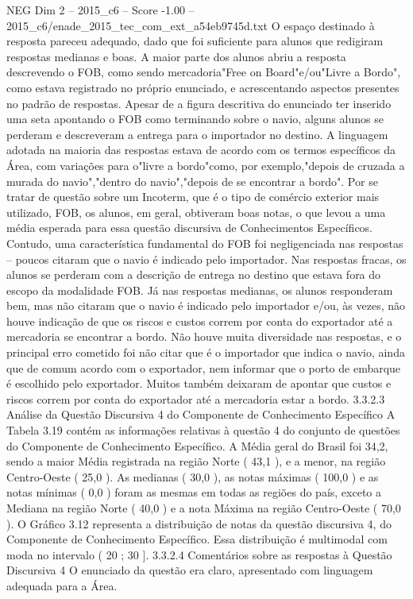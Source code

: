 \begin{textsample}{NEG Dim 2 – 2015\_c6 – Score -1.00 – 2015\_c6/enade\_2015\_tec\_com\_ext\_a54eb9745d.txt}
O espaço destinado à resposta pareceu adequado, dado que foi suficiente para alunos que redigiram respostas medianas e boas.
A maior parte dos alunos abriu a resposta descrevendo o FOB, como sendo mercadoria"Free on Board"e/ou"Livre a Bordo", como estava registrado no próprio enunciado, e acrescentando aspectos presentes no padrão de respostas.
Apesar de a figura descritiva do enunciado ter inserido uma seta apontando o FOB como terminando sobre o navio, alguns alunos se perderam e descreveram a entrega para o importador no destino.
A linguagem adotada na maioria das respostas estava de acordo com os termos específicos da Área, com variações para o"livre a bordo"como, por exemplo,"depois de cruzada a murada do navio","dentro do navio","depois de se encontrar a bordo".
Por se tratar de questão sobre um Incoterm, que é o tipo de comércio exterior mais utilizado, FOB, os alunos, em geral, obtiveram boas notas, o que levou a uma média esperada para essa questão discursiva de Conhecimentos Específicos.
Contudo, uma característica fundamental do FOB foi negligenciada nas respostas – poucos citaram que o navio é indicado pelo importador.
Nas respostas fracas, os alunos se perderam com a descrição de entrega no destino que estava fora do escopo da modalidade FOB.
Já nas respostas medianas, os alunos responderam bem, mas não citaram que o navio é indicado pelo importador e/ou, às vezes, não houve indicação de que os riscos e custos correm por conta do exportador até a mercadoria se encontrar a bordo.
Não houve muita diversidade nas respostas, e o principal erro cometido foi não citar que é o importador que indica o navio, ainda que de comum acordo com o exportador, nem informar que o porto de embarque é escolhido pelo exportador.
Muitos também deixaram de apontar que custos e riscos correm por conta do exportador até a mercadoria estar a bordo. 3.3.2.3 Análise da Questão Discursiva 4 do Componente de Conhecimento Específico A Tabela 3.19 contém as informações relativas à questão 4 do conjunto de questões do Componente de Conhecimento Específico.
A Média geral do Brasil foi 34,2, sendo a maior Média registrada na região Norte ( 43,1 ), e a menor, na região Centro-Oeste ( 25,0 ).
As medianas ( 30,0 ), as notas máximas ( 100,0 ) e as notas mínimas ( 0,0 ) foram as mesmas em todas as regiões do país, exceto a Mediana na região Norte ( 40,0 ) e a nota Máxima na região Centro-Oeste ( 70,0 ).
O Gráfico 3.12 representa a distribuição de notas da questão discursiva 4, do Componente de Conhecimento Específico.
Essa distribuição é multimodal com moda no intervalo ( 20 ; 30 ]. 3.3.2.4 Comentários sobre as respostas à Questão Discursiva 4 O enunciado da questão era claro, apresentado com linguagem adequada para a Área.

\end{textsample}
